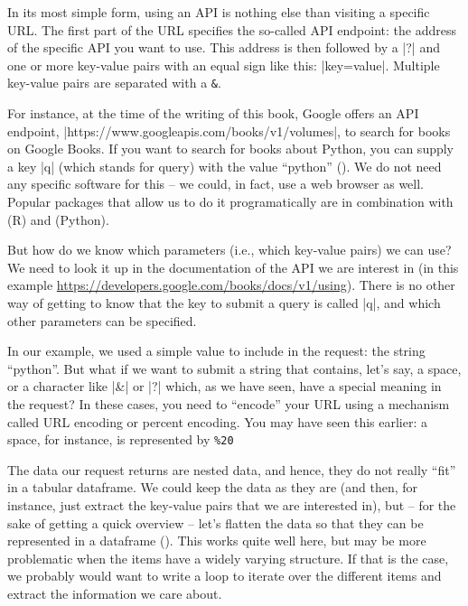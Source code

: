 In its most simple form, using an API is nothing else than visiting
a specific URL. The first part of the URL specifies the so-called
API endpoint: the address of the specific API you want to use. This
address is then followed by a |?| and one or more key-value pairs with an
equal sign like this: |key=value|. Multiple key-value pairs are
separated with a \texttt{\&}.

For instance, at the time of the writing of this book, Google offers
an API endpoint, |https://www.googleapis.com/books/v1/volumes|, to search for books on Google Books.
If you want to search for books about Python, you can supply a key |q| (which stands for query) with
the value ``python'' (). We do not need any specific
software for this -- we could, in fact, use a web browser as well.
Popular packages that allow us to do it programatically are 
in combination with  (R) and  (Python).

But how do we know which parameters (i.e., which key-value pairs) we can use?
We need to look it up in the documentation of the API we are
interest in (in this example \url{https://developers.google.com/books/docs/v1/using}).
There is no other way of getting to know that the key to submit a query
is called |q|, and which other parameters can be specified.

\begin{feature}
  In our example, we used a simple value to include in the request:
  the string ``python''.  But what if we want to submit a string that
  contains, let's say, a space, or a character like |&| or |?| which,
  as we have seen, have a special meaning in the request? In these
  cases, you need to ``encode'' your URL using a mechanism called URL
  encoding or percent encoding. You may have seen this earlier: a
  space, for instance, is represented by \texttt{\%20}
\end{feature}





The data our request returns are nested data, and hence, they do not
really ``fit'' in a tabular dataframe. We could keep the data as they
are (and then, for instance, just extract the key-value pairs that we
are interested in), but -- for the sake of getting a quick overview --
let's flatten the data so that they can be represented in a dataframe
(). This works quite well here, but may be more
problematic when the items have a widely varying structure. If that
is the case, we probably would want to write a loop to iterate
over the different items and extract the information we care about.

